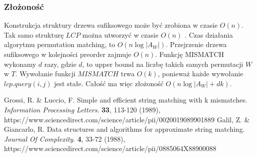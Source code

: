 \documentclass[a4paper,11pt]{article}
\begin{document}
\subsubsection*{Złożoność}
Konstrukcja struktury drzewa sufiksowego może być zrobiona w czasie $O(n)$. Tak samo strukturę $LCP$ można utworzyć w czasie $O(n)$ \cite{GALIL198833}. Czas działania algorytmu permutation matching, to $O(n\log|A_W|)$. Przejrzenie drzewa sufiksowego w kolejności preorder zajmuje $O(n)$. Funkcję MISMATCH wykonamy $d$ razy, gdzie $d$, to upper bound na liczbę takich samych permutacji $W$ w $T$. Wywołanie funkcji $MISMATCH$ trwa $O(k)$, ponieważ każde wywołanie $lcp.query(i,j)$ jest stałe. Całość ma więc złożoność $O(n\log|A_W| + dk)$.
\begin{thebibliography}{}
Grossi, R. \& Luccio, F. Simple and efficient string matching with k mismatches. {\em Information Processing Letters}. \textbf{33}, 113-120 (1989), https://www.sciencedirect.com/science/article/pii/0020019089901889
Galil, Z. \& Giancarlo, R. Data structures and algorithms for approximate string matching. {\em Journal Of Complexity}. \textbf{4}, 33-72 (1988), https://www.sciencedirect.com/science/article/pii/0885064X88900088
\end{thebibliography}
\end{document}
